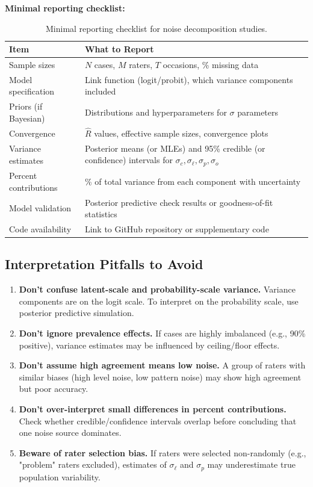 \documentclass[num-refs]{wiley-article}
\begin{document}
\textbf{Minimal reporting checklist:}
\begin{table}[h!]
\centering
\small
\begin{tabular}{p{}p{}}
\toprule
\textbf{Item} & \textbf{What to Report} \\
\midrule
Sample sizes & $N$ cases, $M$ raters, $T$ occasions, \% missing data \\
Model specification & Link function (logit/probit), which variance components included \\
Priors (if Bayesian) & Distributions and hyperparameters for $\sigma$ parameters \\
Convergence & $\hat{R}$ values, effective sample sizes, convergence plots \\
Variance estimates & Posterior means (or MLEs) and 95\% credible (or confidence) intervals for $\sigma_c, \sigma_\ell, \sigma_p, \sigma_o$ \\
Percent contributions & \% of total variance from each component with uncertainty \\
Model validation & Posterior predictive check results or goodness-of-fit statistics \\
Code availability & Link to GitHub repository or supplementary code \\
\bottomrule
\end{tabular}
\caption{Minimal reporting checklist for noise decomposition studies.}
\label{tab:reporting}
\end{table}

\subsection*{Interpretation Pitfalls to Avoid}

\begin{enumerate}
    \item \textbf{Don't confuse latent-scale and probability-scale variance.} Variance components are on the logit scale. To interpret on the probability scale, use posterior predictive simulation.

    \item \textbf{Don't ignore prevalence effects.} If cases are highly imbalanced (e.g., 90\% positive), variance estimates may be influenced by ceiling/floor effects.

    \item \textbf{Don't assume high agreement means low noise.} A group of raters with similar biases (high level noise, low pattern noise) may show high agreement but poor accuracy.

    \item \textbf{Don't over-interpret small differences in percent contributions.} Check whether credible/confidence intervals overlap before concluding that one noise source dominates.

    \item \textbf{Beware of rater selection bias.} If raters were selected non-randomly (e.g., "problem" raters excluded), estimates of $\sigma_\ell$ and $\sigma_p$ may underestimate true population variability.
\end{enumerate}
\end{document}
